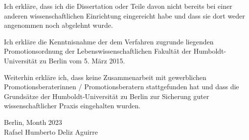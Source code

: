 Ich erkläre, dass ich die Dissertation oder Teile davon nicht bereits bei einer anderen wissenschaftlichen Einrichtung eingereicht habe und dass sie dort weder angenommen noch abgelehnt wurde.

Ich erkläre die Kenntnisnahme der dem Verfahren zugrunde liegenden Promotionsordnung der Lebenswissenschaftlichen Fakultät der Humboldt-Universität zu Berlin vom 5. März 2015.

Weiterhin erkläre ich, dass keine Zusammenarbeit mit gewerblichen Promotionsberaterinnen / Promotionsberatern stattgefunden hat und dass die Grundsätze der Humboldt-Universität zu Berlin zur Sicherung guter wissenschaftlicher Praxis eingehalten wurden.

\vspace{0.5cm}
\flushright
Berlin, Month 2023
\vspace{1.0cm}
\\
Rafael Humberto Deliz Aguirre
